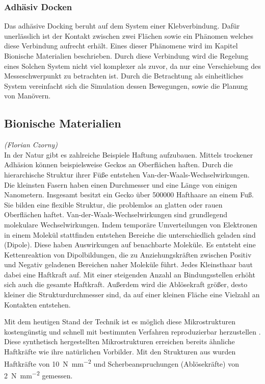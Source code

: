\subsubsection{Adhäsiv Docken}

	Das adhäsive Docking beruht auf dem System einer Klebverbindung. Dafür unerlässlich ist der Kontakt zwischen zwei Flächen sowie ein Phänomen welches diese Verbindung aufrecht erhält. Eines dieser Phänomene wird im Kapitel Bionische Materialien beschrieben. Durch diese Verbindung wird die Regelung eines Solchen System nicht viel komplexer als zuvor, da nur eine Verschiebung des Messeschwerpunkt zu betrachten ist. Durch die Betrachtung als einheitliches System vereinfacht sich die Simulation dessen Bewegungen, sowie die Planung von Manövern.     
						
		
		
		\subsection{Bionische Materialien}
		\hfill\emph{(Florian Czorny)}\\
		In der Natur gibt es zahlreiche Beispiele Haftung aufzubauen. Mittels trockener Adhäsion können beispielsweise Geckos an Oberflächen haften. Durch die hierarchische Struktur ihrer Füße entstehen Van-der-Waals-Wechselwirkungen. Die kleinsten Fasern haben einen Durchmesser und eine Länge von einigen Nanometern. Insgesamt besitzt ein Gecko über \num{500000} Hafthaare an einem Fuß. Sie bilden eine flexible Struktur, die problemlos an glatten oder rauen Oberflächen haftet. Van-der-Waals-Wechselwirkungen sind grundlegend molekulare Wechselwirkungen. Indem temporäre Umverteilungen von Elektronen in einem Molekül stattfinden entstehen Bereiche die unterschiedlich geladen sind (Dipole). Diese haben Auswirkungen auf benachbarte Moleküle. Es entsteht eine Kettenreaktion von Dipolbildungen, die zu Anziehungskräften zwischen Positiv und Negativ geladenen Bereichen naher Moleküle führt. Jedes Kleinsthaar baut dabei eine Haftkraft auf. Mit einer steigenden Anzahl an Bindungsstellen erhöht sich auch die gesamte Haftkraft. Außerdem wird die Ablösekraft größer, desto kleiner die Strukturdurchmesser sind, da auf einer kleinen Fläche eine Vielzahl an Kontakten entstehen. \cite{Schwerter.} 

Mit dem heutigen Stand der Technik ist es möglich diese Mikrostrukturen kostengünstig und schnell mit bestimmten Verfahren reproduzierbar herzustellen \cite{Trentlage.}. Diese synthetisch hergestellten Mikrostrukturen erreichen bereits ähnliche Haftkräfte wie ihre natürlichen Vorbilder. Mit den Strukturen aus  wurden Haftkräfte von \SI{10}{\newton\per\square\milli\metre} und Scherbeanspruchungen (Ablösekräfte)  von \SI{2}{\newton\per\square\milli\metre} gemessen.


